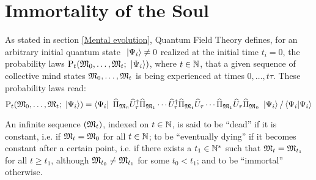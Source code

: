 


\section{Immortality of the Soul}

 As stated in section \ref{Mental evolution}, Quantum Field Theory defines, for an arbitrary initial quantum state $\ \left|{\Psi_i}\right\rangle \neq 0$ realized at the initial time $t_i = 0$, the probability laws $\mathrm P_t(\mathfrak{M}_0, \dotsc, \mathfrak{M}_t; \ \left|{\Psi_i}\right\rangle)$, where $t \in \mathbb{N}$, that a given sequence of collective mind states $\mathfrak{M}_0, \dotsc, \mathfrak{M}_t$ is being experienced at times $0, \dotsc, t \tau$. These probability laws read:
\begin{equation*}
\mathrm P_t(\mathfrak{M}_0, \dotsc, \mathfrak{M}_t; \ \left|{\Psi_i}\right\rangle) = \left\langle{\Psi_i}\right|\  \widehat{\Pi}_{\mathfrak{M}_0} \widehat{U}^{\dagger}_\tau \widehat{\Pi}_{\mathfrak{M}_1} \dotsm \widehat{U}^{\dagger}_\tau \widehat{\Pi}_{\mathfrak{M}_t} \widehat{U}_\tau \dotsm \widehat{\Pi}_{\mathfrak{M}_1} \widehat{U}_\tau \widehat{\Pi}_{\mathfrak{M}_0} \ \left|{\Psi_i}\right\rangle / \left\langle{\Psi_i}|{\Psi_i}\right\rangle
\end{equation*}

 An infinite sequence $(\mathfrak{M}_t)$, indexed on $t \in \mathbb{N}$, is said to be ``dead'' if it is constant, i.e. if $\mathfrak{M}_t = \mathfrak{M}_0$ for all $t \in \mathbb{N}$; to be ``eventually dying'' if it becomes constant after a certain point, i.e. if there exists a $t_1 \in \mathbb{N}^*$ such that $\mathfrak{M}_t = \mathfrak{M}_{t_1}$ for all $t \geq t_1$, although $\mathfrak{M}_{t_0} \neq \mathfrak{M}_{t_1}$ for some $t_0 < t_1$; and to be ``immortal'' otherwise.

